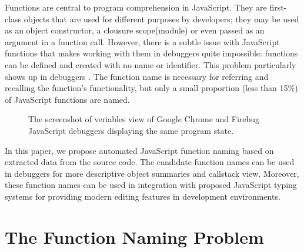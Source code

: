 \documentclass[conference]{IEEEtran}
\begin{document}
Functions are central to program comprehension in JavaScript. They are first-class objects that are used for different purposes by developers; 
they may be used as an object  constructor, a clousure scope(module) or even  passed as an argument in a function call. However, there is a subtle issue with JavaScript functions that makes working with them in debuggers quite impossible: functions can be defined and created with no name or identifier. This problem particularly shows up in debuggers \cite{Zaytsev}. The function name is necessary for referring and recalling the function's functionality, but only a small proportion (less than 15\%) of JavaScript functions are named.

\begin{figure}[!t]
\centerline{
\hfil
{}}
\caption{The screenshot of veriables view of Google Chrome and Firebug JavaScript debuggers displaying the same program state.}
\label{debuggers-objects}
\end{figure}


In this paper, we propose automated JavaScript function naming based on extracted data from the source code. The candidate function names can be used in debuggers for more descriptive object summaries and callstack view. Moreover, these function names can be used in integration with proposed JavaScript typing systems for providing modern editing features in development environments.

\section{The Function Naming Problem}
\end{document}
